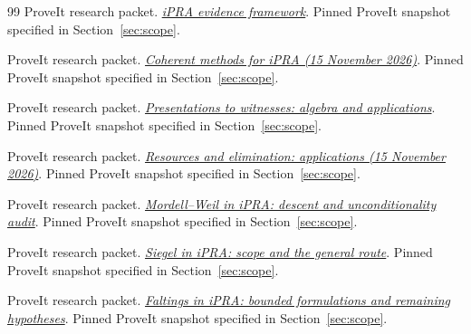 \begin{thebibliography}{99}
 ProveIt research packet.
\href{https://github.com/VladimirReshetnikov/ProveIt/blob/bb86091690bc4f920f046a37cfc87719299b4019/Logic/PrimitiveRecursiveArithmetic/docs/proofs/foundations/ipra_evidence_framework/report.tex}{\emph{iPRA evidence framework}}.
Pinned ProveIt snapshot specified in Section~\ref{sec:scope}.

 ProveIt research packet.
\href{https://github.com/VladimirReshetnikov/ProveIt/blob/bb86091690bc4f920f046a37cfc87719299b4019/Logic/PrimitiveRecursiveArithmetic/docs/proofs/foundations/ipra_coherent_methods_2026-11-15/README.md}{\emph{Coherent methods for iPRA (15 November 2026)}}.
Pinned ProveIt snapshot specified in Section~\ref{sec:scope}.

 ProveIt research packet.
\href{https://github.com/VladimirReshetnikov/ProveIt/blob/bb86091690bc4f920f046a37cfc87719299b4019/Logic/PrimitiveRecursiveArithmetic/docs/proofs/foundations/ipra_presentations_to_witnesses/paper/sections/03_algebra.tex}{\emph{Presentations to witnesses: algebra and applications}}.
Pinned ProveIt snapshot specified in Section~\ref{sec:scope}.

 ProveIt research packet.
\href{https://github.com/VladimirReshetnikov/ProveIt/blob/bb86091690bc4f920f046a37cfc87719299b4019/Logic/PrimitiveRecursiveArithmetic/docs/proofs/foundations/ipra_resources_and_elimination_2026-11-15/paper/sections/06_applications.tex}{\emph{Resources and elimination: applications (15 November 2026)}}.
Pinned ProveIt snapshot specified in Section~\ref{sec:scope}.

 ProveIt research packet.
\href{https://github.com/VladimirReshetnikov/ProveIt/blob/bb86091690bc4f920f046a37cfc87719299b4019/Logic/PrimitiveRecursiveArithmetic/docs/proofs/diophantine-number-theory/mordell_weil_ipra/paper/04_unconditional.tex}{\emph{Mordell--Weil in iPRA: descent and unconditionality audit}}.
Pinned ProveIt snapshot specified in Section~\ref{sec:scope}.

 ProveIt research packet.
\href{https://github.com/VladimirReshetnikov/ProveIt/blob/bb86091690bc4f920f046a37cfc87719299b4019/Logic/PrimitiveRecursiveArithmetic/docs/proofs/diophantine-number-theory/siegel_ipra/paper/05_general_route.tex}{\emph{Siegel in iPRA: scope and the general route}}.
Pinned ProveIt snapshot specified in Section~\ref{sec:scope}.

 ProveIt research packet.
\href{https://github.com/VladimirReshetnikov/ProveIt/blob/bb86091690bc4f920f046a37cfc87719299b4019/Logic/PrimitiveRecursiveArithmetic/docs/proofs/diophantine-number-theory/faltings_ipra/faltings_ipra.tex}{\emph{Faltings in iPRA: bounded formulations and remaining hypotheses}}.
Pinned ProveIt snapshot specified in Section~\ref{sec:scope}.


\end{thebibliography}
